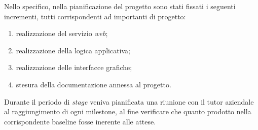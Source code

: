 Nello specifico, nella pianificazione del progetto sono stati fissati i seguenti incrementi, tutti corrispondenti ad importanti  di progetto:
\begin{enumerate}
	\item realizzazione del servizio \textit{web};
	\item realizzazione della logica applicativa;
	\item realizzazione delle interfacce grafiche;
	\item stesura della documentazione annessa al progetto.
\end{enumerate}

Durante il periodo di \textit{stage} veniva pianificata una riunione con il tutor aziendale al raggiungimento di ogni milestone, al fine verificare che quanto prodotto nella corrispondente baseline fosse inerente alle attese.